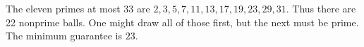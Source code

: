The eleven primes at most 33 are $2,3,5,7,11,13,17,19,23,29,31$. Thus there are 22 nonprime balls. One might draw all of those first, but the next must be prime. The minimum guarantee is $\boxed{23}$.
